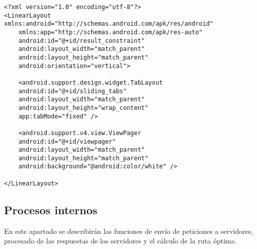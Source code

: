 \begin{lstlisting}[caption=Código XML de la vista con tabs.]
<?xml version="1.0" encoding="utf-8"?>
<LinearLayout xmlns:android="http://schemas.android.com/apk/res/android"
	xmlns:app="http://schemas.android.com/apk/res-auto"
	android:id="@+id/result_constraint"
	android:layout_width="match_parent"
	android:layout_height="match_parent"
	android:orientation="vertical">

	<android.support.design.widget.TabLayout
	android:id="@+id/sliding_tabs"
	android:layout_width="match_parent"
	android:layout_height="wrap_content"
	app:tabMode="fixed" />
	
	<android.support.v4.view.ViewPager
	android:id="@+id/viewpager"
	android:layout_width="match_parent"
	android:layout_height="match_parent"
	android:background="@android:color/white" />

</LinearLayout>
\end{lstlisting}


\subsection[Procesos internos]{Procesos internos}
En este apartado se describirán las funciones de envío de peticiones a servidores, procesado de las respuestas de los servidores y el cálculo de la ruta óptima.
